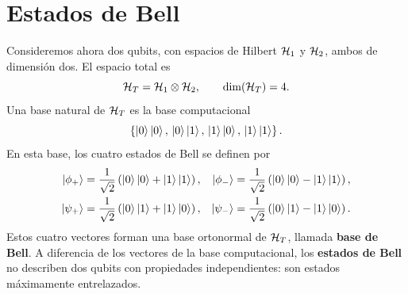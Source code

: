 \documentclass[../main.tex]{subfiles}
\begin{document}
\chapter{Estados de Bell}

Consideremos ahora dos qubits, con espacios de Hilbert $\mathcal{H}_1$ y $\mathcal{H}_2$, ambos de dimensión dos. El espacio total es
\begin{equation*}
    \mathcal{H}_T=\mathcal{H}_1\otimes\mathcal{H}_2,
    \qquad
    \dim(\mathcal{H}_T)=4.
\end{equation*}
Una base natural de $\mathcal{H}_T$ es la base computacional
\begin{equation*}
    \left\{
    \ket{0}\ket{0},\,
    \ket{0}\ket{1},\,
    \ket{1}\ket{0},\,
    \ket{1}\ket{1}
    \right\}.
\end{equation*}
En esta base, los cuatro estados de Bell se definen por
\begin{align*}
    \ket{\phi_+}&=\frac{1}{\sqrt{2}}\left(\ket{0}\ket{0}+\ket{1}\ket{1}\right),&
    \ket{\phi_-}&=\frac{1}{\sqrt{2}}\left(\ket{0}\ket{0}-\ket{1}\ket{1}\right),\\
    \ket{\psi_+}&=\frac{1}{\sqrt{2}}\left(\ket{0}\ket{1}+\ket{1}\ket{0}\right),&
    \ket{\psi_-}&=\frac{1}{\sqrt{2}}\left(\ket{0}\ket{1}-\ket{1}\ket{0}\right).
\end{align*}
Estos cuatro vectores forman una base ortonormal de $\mathcal{H}_T$, llamada \textbf{base de Bell}. A diferencia de los vectores de la base computacional, los \textbf{estados de Bell} no describen dos qubits con propiedades independientes: son estados máximamente entrelazados.
\end{document}
